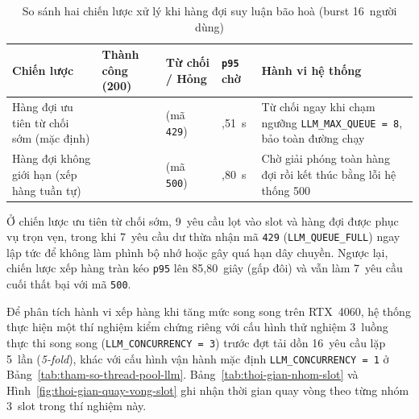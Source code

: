 \begin{table}[htbp]
\centering
\caption{So sánh hai chiến lược xử lý khi hàng đợi suy luận bão hoà (burst 16~người dùng)}
\label{tab:so-sanh-luong-hang-doi}
\footnotesize
\setlength{\tabcolsep}{4pt}
\begin{tabularx}{\textwidth}{
  >{\raggedright\arraybackslash}p{3.6cm}
  >{\raggedleft\arraybackslash}p{1.9cm}
  >{\raggedleft\arraybackslash}p{2.3cm}
  >{\raggedleft\arraybackslash}p{1.8cm}
  >{\raggedright\arraybackslash}X
}
\toprule
\textbf{Chiến lược} & \textbf{Thành công (200)} & \textbf{Từ chối / Hỏng} & \texttt{p95} \textbf{chờ} & \textbf{Hành vi hệ thống} \\
\midrule
Hàng đợi ưu tiên từ chối sớm (mặc định) & 9 & 7 (mã \texttt{429}) & 42,51~s & Từ chối ngay khi chạm ngưỡng \texttt{LLM\_\allowbreak{}MAX\_\allowbreak{}QUEUE = 8}, bảo toàn đường chạy \\
\midrule
Hàng đợi không giới hạn (xếp hàng tuần tự) & 9 & 7 (mã \texttt{500}) & 85,80~s & Chờ giải phóng toàn hàng đợi rồi kết thúc bằng lỗi hệ thống 500 \\
\bottomrule
\end{tabularx}
\end{table}

Ở chiến lược ưu tiên từ chối sớm, 9~yêu cầu lọt vào slot và hàng đợi được phục vụ trọn vẹn, trong khi 7~yêu cầu dư thừa nhận mã \texttt{429} (\texttt{LLM\_\allowbreak{}QUEUE\_\allowbreak{}FULL}) ngay lập tức để không làm phình bộ nhớ hoặc gây quá hạn dây chuyền. Ngược lại, chiến lược xếp hàng tràn kéo \texttt{p95} lên 85,80~giây (gấp đôi) và vẫn làm 7~yêu cầu cuối thất bại với mã \texttt{500}.

Để phân tích hành vi xếp hàng khi tăng mức song song trên RTX~4060, hệ thống thực hiện một thí nghiệm kiểm chứng riêng với cấu hình thử nghiệm 3~luồng thực thi song song (\texttt{LLM\_\allowbreak{}CONCURRENCY = 3}) trước đợt tải dồn 16~yêu cầu lặp 5~lần (\textit{5-fold}), khác với cấu hình vận hành mặc định \texttt{LLM\_\allowbreak{}CONCURRENCY = 1} ở Bảng~\ref{tab:tham-so-thread-pool-llm}. Bảng~\ref{tab:thoi-gian-nhom-slot} và Hình~\ref{fig:thoi-gian-quay-vong-slot} ghi nhận thời gian quay vòng theo từng nhóm 3~slot trong thí nghiệm này.


